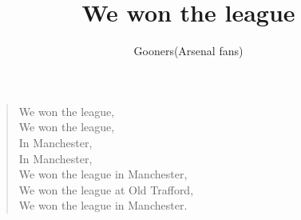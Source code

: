 \documentclass[a4paper,12pt]{article}
\title{We won the league}
\author{Gooners(Arsenal fans)}
\date{}
\begin{document}
	
	\maketitle
	
	\begin{verse}
		
		We won the league, \\
		We won the league, \\
		In Manchester, \\
		In Manchester, \\
		We won the league in Manchester, \\
		We won the league at Old Trafford, \\
		We won the league in Manchester.
		
	\end{verse}
	
\end{document}

